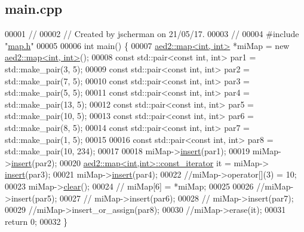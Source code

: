 \hypertarget{main_8cpp_source}{}\subsection{main.\+cpp}

\begin{DoxyCode}
00001 \textcolor{comment}{//}
00002 \textcolor{comment}{// Created by jscherman on 21/05/17.}
00003 \textcolor{comment}{//}
00004 \textcolor{preprocessor}{#include "\hyperlink{map_8h}{map.h}"}
00005 
00006 \textcolor{keywordtype}{int} main() \{
00007     \hyperlink{classaed2_1_1map}{aed2::map<int, int>} *miMap = \textcolor{keyword}{new} \hyperlink{classaed2_1_1map}{aed2::map<int, int>}();
00008     \textcolor{keyword}{const} std::pair<const int, int> par1 = std::make\_pair(3, 5);
00009     \textcolor{keyword}{const} std::pair<const int, int> par2 = std::make\_pair(7, 5);
00010     \textcolor{keyword}{const} std::pair<const int, int> par3 = std::make\_pair(5, 5);
00011     \textcolor{keyword}{const} std::pair<const int, int> par4 = std::make\_pair(13, 5);
00012     \textcolor{keyword}{const} std::pair<const int, int> par5 = std::make\_pair(10, 5);
00013     \textcolor{keyword}{const} std::pair<const int, int> par6 = std::make\_pair(8, 5);
00014     \textcolor{keyword}{const} std::pair<const int, int> par7 = std::make\_pair(1, 5);
00015 
00016     \textcolor{keyword}{const} std::pair<const int, int> par8 = std::make\_pair(10, 234);
00017 
00018     miMap->\hyperlink{classaed2_1_1map_a6941cde9a79c27f054b5c97a587a1854_a6941cde9a79c27f054b5c97a587a1854}{insert}(par1);
00019     miMap->\hyperlink{classaed2_1_1map_a6941cde9a79c27f054b5c97a587a1854_a6941cde9a79c27f054b5c97a587a1854}{insert}(par2);
00020     \hyperlink{classaed2_1_1map_1_1const__iterator}{aed2::map<int,int>::const\_iterator} it = miMap->
      \hyperlink{classaed2_1_1map_a6941cde9a79c27f054b5c97a587a1854_a6941cde9a79c27f054b5c97a587a1854}{insert}(par3);
00021     miMap->\hyperlink{classaed2_1_1map_a6941cde9a79c27f054b5c97a587a1854_a6941cde9a79c27f054b5c97a587a1854}{insert}(par4);
00022     \textcolor{comment}{//miMap->operator[](3) = 10;}
00023     miMap->\hyperlink{classaed2_1_1map_a2bfa5165825979bf2431db55bc6bc9ca_a2bfa5165825979bf2431db55bc6bc9ca}{clear}();
00024    \textcolor{comment}{// miMap[6] = *miMap;}
00025 
00026     \textcolor{comment}{//miMap->insert(par5);}
00027    \textcolor{comment}{// miMap->insert(par6);}
00028    \textcolor{comment}{// miMap->insert(par7);}
00029     \textcolor{comment}{//miMap->insert\_or\_assign(par8);}
00030     \textcolor{comment}{//miMap->erase(it);}
00031     \textcolor{keywordflow}{return} 0;
00032 \}
\end{DoxyCode}
